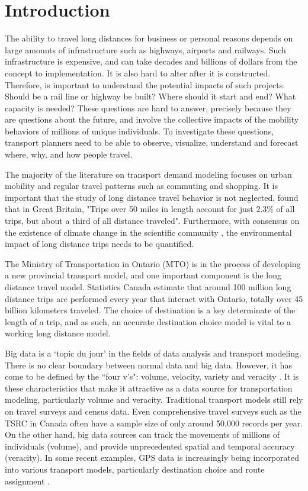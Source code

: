 \chapter{Introduction}
The ability to travel long distances for business or personal reasons depends on large amounts of infrastructure such as highways, airports and railways. Such infrastructure is expensive, and can take decades and billions of dollars from the concept to implementation. It is also hard to alter after it is constructed. Therefore, is important to understand the potential impacts of such projects. Should be a rail line or highway be built? Where should it start and end? What capacity is needed? These questions are hard to answer, precisely because they are questions about the future, and involve the collective impacts of the mobility behaviors of millions of unique individuals. To investigate these questions, transport planners need to be able to observe, visualize, understand and forecast where, why, and how people travel. 

The majority of the literature on transport demand modeling focuses on urban mobility and regular travel patterns such as commuting and shopping. It is important that the study of long distance travel behavior is not neglected. \textcite{rohr2010modelling} found that in Great Britain, "Trips over 50 miles in length account for just 2.3\% of all trips, but about a third of all distance traveled". Furthermore, with  consensus on the existence of climate change in the scientific community \parencite{oreskes2004scientific}, the environmental impact of long distance trips needs to be quantified.

The Ministry of Transportation in Ontario (MTO) is in the process of developing a new provincial transport model, and one important component is the long distance travel model. Statistics Canada estimate that around 100 million long distance trips are performed every year that interact with Ontario, totally over 45 billion kilometers traveled. The choice of destination is a key determinate of the length of a trip, and as such, an accurate destination choice model is vital to a working long distance model. 

Big data is a `topic du jour' in the fields of data analysis and transport modeling. There is no clear boundary between normal data and big data. However, it has come to be defined by the ``four v's": volume, velocity, variety and veracity \parencite{beyer2012importance}. It is these characteristics that make it attractive as a data source for transportation modeling, particularly volume and veracity. Traditional transport models still rely on travel surveys and census data. Even comprehensive travel surveys such as the TSRC in Canada  often have a sample size of only around 50,000 records per year. On the other hand, big data sources can track the movements of millions of individuals (volume), and provide unprecedented spatial and temporal accuracy (veracity). In some recent examples, GPS data is increasingly being incorporated into various transport models, particularly destination choice \parencite{schonfelder2006analysis, pan2006cellular} and route assignment \parencite{broach2012cyclists, menghini2010route}.

